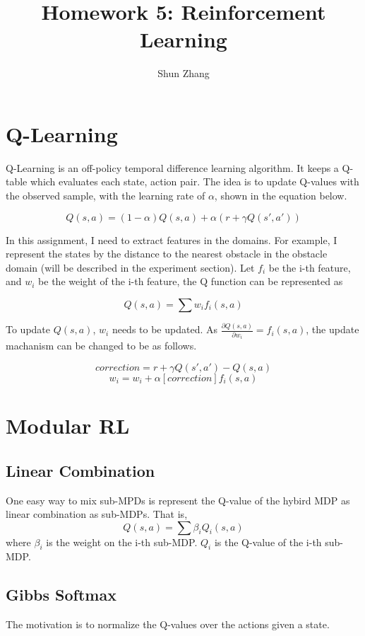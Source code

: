 \documentclass[11pt]{article}
\title{Homework 5: Reinforcement Learning}
\author{Shun Zhang}
\date{}
\begin{document}
\maketitle

\section{Q-Learning}

Q-Learning is an off-policy temporal difference learning algorithm. It
keeps a Q-table which evaluates each state, action pair. The idea is
to update Q-values with the observed sample, with the learning rate of
$\alpha$, shown in the equation below.

$$Q(s, a) = (1 - \alpha) Q(s, a) + \alpha (r + \gamma Q(s', a'))$$

In this assignment, I need to extract features in the domains. For
example, I represent the states by the distance to the nearest
obstacle in the obstacle domain (will be described in the experiment
section). Let $f_i$ be the i-th feature, and $w_i$ be the weight of
the i-th feature, the Q function can be represented as

$$Q(s, a) = \sum w_i f_i(s, a)$$

To update $Q(s, a)$, $w_i$ needs to be updated. As $\frac{\partial
Q(s, a)}{\partial w_i} = f_i(s, a)$, the update machanism can be
changed to be as follows.

$$correction = r + \gamma Q(s', a') - Q(s, a)$$
$$w_i = w_i + \alpha [correction] f_i(s, a)$$

\section{Modular RL}

\subsection{Linear Combination}

One easy way to mix sub-MPDs is represent the Q-value of the hybird
MDP as linear combination as sub-MDPs. That is,
$$Q(s, a) = \sum{\beta_i Q_i(s, a)}$$
where $\beta_i$ is the weight on the i-th sub-MDP. $Q_i$ is the
Q-value of the i-th sub-MDP.

\subsection{Gibbs Softmax}

The motivation is to normalize the Q-values over the actions given a
state.
\end{document}
